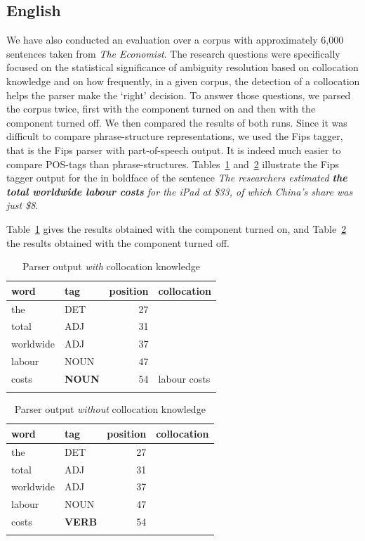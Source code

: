 \documentclass[output=paper]{langsci/langscibook}
\begin{document}
\subsection{English}
We have also conducted an evaluation over a corpus with approximately 6,000 sentences taken from \textit{The Economist}. The research questions were specifically focused on the statistical significance of ambiguity resolution based on collocation knowledge and on how frequently, in a given corpus, the detection of a collocation helps the parser make the `right' decision. 
To answer those questions, we parsed the corpus twice, first with the  component turned on and then with the component turned off. We then compared the results of both runs. Since it was difficult to compare phrase-structure representations, we used the Fips tagger, that is the Fips parser with part-of-speech output. It is indeed much easier to compare POS-tags than phrase-structures. Tables~\ref{fou:fig7} and~\ref{fou:fig8} illustrate the Fips tagger output for the  in boldface of the sentence \textit{The researchers estimated \textbf{the total worldwide labour costs} for the iPad at \$33, of which China’s share was just \$8}.

Table~\ref{fou:fig7} gives the results obtained with the  component turned on, and Table~\ref{fou:fig8} the results obtained with the component turned off.
 
\begin{table}
  \begin{tabular}{llrl}
    \lsptoprule
    word & tag & position & collocation \\ %
    \midrule
    the & DET & 27\\
    total & ADJ & 31 \\
    worldwide & ADJ & 37 \\
    labour & NOUN & 47 \\
    costs & \textbf{NOUN} & 54 & labour costs \tabularnewline
    \lspbottomrule
  \end{tabular}
  \caption{\label{fou:fig7}Parser output \textit{with} collocation knowledge}
\end{table} 
 

\begin{table}
  \begin{tabular}{llrl}
    \lsptoprule
    word & tag & position & collocation \\ %
    \midrule
    the & DET & 27\\
    total & ADJ & 31 \\
    worldwide & ADJ & 37 \\
    labour & NOUN & 47 \\
    costs & \textbf{VERB} & 54 \tabularnewline
    \lspbottomrule
  \end{tabular}
  \caption{\label{fou:fig8}Parser output \textit{without} collocation knowledge}
\end{table} 
 
\end{document}
